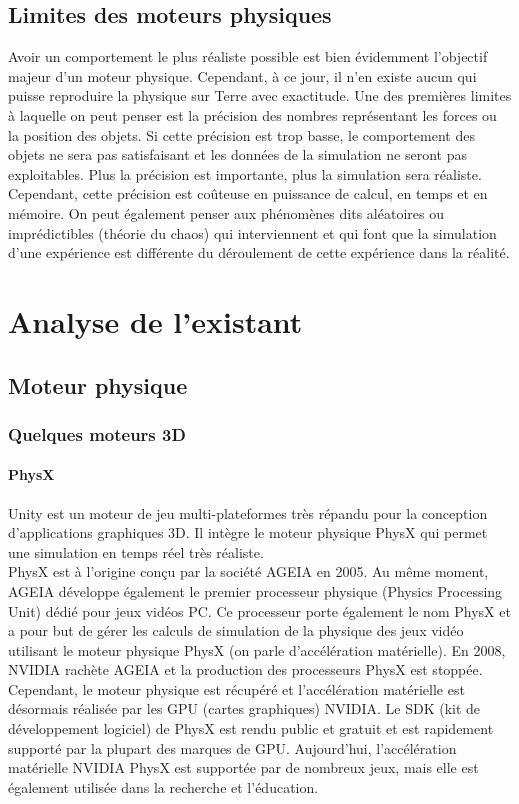 \documentclass{report}
\begin{document}
\section{Limites des moteurs physiques}

Avoir un comportement le plus réaliste possible est bien évidemment l’objectif majeur d’un moteur physique. Cependant, à ce jour, il n’en existe aucun qui puisse reproduire la physique sur Terre avec exactitude. Une des premières limites à laquelle on peut penser est la précision des nombres représentant les forces ou la position des objets. Si cette précision est trop basse, le comportement des objets ne sera pas satisfaisant et les données de la simulation ne seront pas exploitables. Plus la précision est importante, plus la simulation sera réaliste. Cependant, cette précision est coûteuse en puissance de calcul, en temps et en mémoire. On peut également penser aux phénomènes dits aléatoires ou imprédictibles (théorie du chaos) qui interviennent et qui font que la simulation d’une expérience est différente du déroulement de cette expérience dans la réalité.

\chapter{Analyse de l'existant}

\section{Moteur physique}

\subsection{Quelques moteurs 3D}

\subsubsection{PhysX}

Unity est un moteur de jeu multi-plateformes très répandu pour la conception d’applications graphiques 3D. Il intègre le moteur physique PhysX qui permet une simulation en temps réel très réaliste. \\

PhysX est à l’origine conçu par la société AGEIA en 2005. Au même moment, AGEIA développe également le premier processeur physique (Physics Processing Unit) dédié pour jeux vidéos PC. Ce processeur porte également le nom PhysX et a pour but de gérer les calculs de simulation de la physique des jeux vidéo utilisant le moteur physique PhysX (on parle d’accélération matérielle). En 2008, NVIDIA rachète AGEIA et la production des processeurs PhysX est stoppée. Cependant, le moteur physique est récupéré et l’accélération matérielle est désormais réalisée par les GPU (cartes graphiques) NVIDIA. Le SDK (kit de développement logiciel) de PhysX est rendu public et gratuit et est rapidement supporté par la plupart des marques de GPU. Aujourd’hui, l’accélération matérielle NVIDIA PhysX est supportée par de nombreux jeux, mais elle est également utilisée dans la recherche et l’éducation. \\
\end{document}
